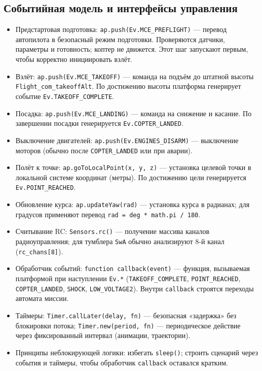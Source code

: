 \subsection{Событийная модель и интерфейсы управления}
\begin{itemize}
  \item Предстартовая подготовка: \texttt{ap.push(Ev.MCE\_PREFLIGHT)} — перевод автопилота в безопасный режим подготовки. Проверяются датчики, параметры и готовность; коптер не движется. Этот шаг запускают первым, чтобы корректно инициировать взлёт.
  \item Взлёт: \texttt{ap.push(Ev.MCE\_TAKEOFF)} — команда на подъём до штатной высоты \texttt{Flight\_com\_takeoffAlt}. По достижению высоты платформа генерирует событие \texttt{Ev.TAKEOFF\_COMPLETE}.
  \item Посадка: \texttt{ap.push(Ev.MCE\_LANDING)} — команда на снижение и касание. По завершении посадки генерируется \texttt{Ev.COPTER\_LANDED}.
  \item Выключение двигателей: \texttt{ap.push(Ev.ENGINES\_DISARM)} — выключение моторов (обычно после \texttt{COPTER\_LANDED} или при аварии).
  \item Полёт к точке: \texttt{ap.goToLocalPoint(x, y, z)} — установка целевой точки в локальной системе координат (метры). По достижению цели генерируется \texttt{Ev.POINT\_REACHED}.
  \item Обновление курса: \texttt{ap.updateYaw(rad)} — установка курса в радианах; для градусов применяют перевод \texttt{rad = deg * math.pi / 180}.
  \item Считывание RC: \texttt{Sensors.rc()} — получение массива каналов радиоуправления; для тумблера \texttt{SwA} обычно анализируют 8-й канал (\texttt{rc\_chans[8]}).
  \item Обработчик событий: \texttt{function callback(event)} — функция, вызываемая платформой при наступлении \texttt{Ev.*} (\texttt{TAKEOFF\_COMPLETE}, \texttt{POINT\_REACHED}, \texttt{COPTER\_LANDED}, \texttt{SHOCK}, \texttt{LOW\_VOLTAGE2}). Внутри \texttt{callback} строятся переходы автомата миссии.
  \item Таймеры: \texttt{Timer.callLater(delay, fn)} — безопасная «задержка» без блокировки потока; \texttt{Timer.new(period, fn)} — периодическое действие через фиксированный интервал (анимации, траектории).
  \item Принципы неблокирующей логики: избегать \texttt{sleep()}; строить сценарий через события и таймеры, чтобы обработчик \texttt{callback} оставался кратким.
\end{itemize}

